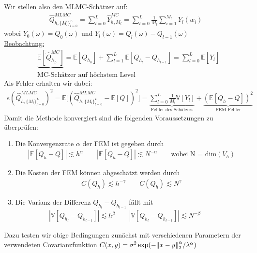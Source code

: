 Wir stellen also den MLMC-Schätzer auf:
\begin{align*}
     \hat{Q}^{MLMC}_{h,\{ M_l \}_{l=0}^{L}} = \sum_{l = 0}^{L} \hat{Y}_{h,M_l}^{MC} = \sum_{l=0}^{L} \frac{1}{M_l} \sum_{i=1}^{M_l} Y_l(w_i)
\end{align*} 
wobei $Y_0(\omega) = Q_0(\omega)$ und $Y_l(\omega) = Q_l(\omega) - Q_{l-1}(\omega)$ \\
\underline{Beobachtung:}
\begin{align*}
	&\underbrace{\mathbb{E}[\hat{Q}^{MC}_{h_L}]} = \mathbb{E}[Q_{h_0}]+ \sum_{l=1}^{L} \mathbb{E}[Q_{h_l}-Q_{h_{l-1}}] = \sum_{l=0}^{L} \mathbb{E}[\hat{Y}_l]\\
	&\text{MC-Schätzer auf höchstem Level}
\end{align*}
Als Fehler erhalten wir dabei:
\begin{align*}
	e(\hat{Q}^{MLMC}_{h,\{ M_l \}_{l=0}^{L}})^2 = \mathbb{E} \bigl[ (\hat{Q}^{MLMC}_{h,\{ M_l \}_{l=0}^{L}} - \mathbb{E}[Q] )^2\bigr] =\underset{\text{Fehler des Schätzers}}{\underbrace{\sum_{l=0}^{L} \frac{1}{M_l} \mathbb{V}[Y_l] }} + \underset{\text{FEM Fehler}}{\underbrace{(\mathbb{E}[Q_h-Q])^2}}
\end{align*}
Damit die Methode konvergiert sind die folgenden Voraussetzungen zu überprüfen: 
\begin{enumerate}
	  \item Die Konvergenzrate $\alpha$ der FEM ist gegeben durch
		  \begin{align*}
		       |\mathbb{E}[Q_h-Q]| \lesssim h^{\alpha} \qquad |\mathbb{E}[Q_h-Q]| \lesssim N^{- \alpha} \qquad
		       \text{wobei N = dim} (V_h) 
		  \end{align*}
	\item Die Kosten der FEM können abgeschätzt werden durch 
		\begin{align*}
		    C(Q_h) \lesssim h^{-\gamma}  \qquad 
		    C(Q_h) \lesssim N^{\gamma}
		\end{align*}
	\item Die Varianz der Differenz $Q_{h_l} - Q_{h_{l-1}}$ fällt mit 
		\begin{align*}
			|\mathbb{V}[Q_{h_l}-Q_{h_{l-1}}]| \lesssim h^{\beta} \qquad 
			|\mathbb{V}[Q_{h_l}-Q_{h_{l-1}}]| \lesssim N^{- \beta} \qquad
		\end{align*}
\end{enumerate}
Dazu testen wir obige Bedingungen zunächst mit verschiedenen Parametern der verwendeten Covarianzfunktion $C(x,y)= \sigma^2 \exp ( - \norm{x-y}^{\alpha}_2 / \lambda^{\alpha})$
